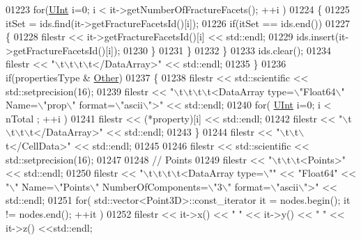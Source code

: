 \begin{DoxyCode}
01223             \textcolor{keywordflow}{for}(\hyperlink{namespaceFVCode3D_a4bf7e328c75d0fd504050d040ebe9eda}{UInt} i=0; i < it->getNumberOfFractureFacets(); ++i )
01224             \{
01225                 itSet = ids.find(it->getFractureFacetsId()[i]);
01226                 \textcolor{keywordflow}{if}(itSet == ids.end())
01227                 \{
01228                     filestr << it->getFractureFacetsId()[i] << std::endl;
01229                     ids.insert(it->getFractureFacetsId()[i]);
01230                 \}
01231             \}
01232         \}
01233         ids.clear();
01234         filestr << \textcolor{stringliteral}{"\(\backslash\)t\(\backslash\)t\(\backslash\)t\(\backslash\)t</DataArray>"} << std::endl;
01235     \}
01236     \textcolor{keywordflow}{if}(propertiesType & \hyperlink{namespaceFVCode3D_ab3abc77722284ce4344be90bb61c1a41ab8c2eb493dc98b25b8fc2e3e176d4892}{Other})
01237     \{
01238         filestr << std::scientific << std::setprecision(16);
01239         filestr << \textcolor{stringliteral}{"\(\backslash\)t\(\backslash\)t\(\backslash\)t\(\backslash\)t<DataArray type=\(\backslash\)"Float64\(\backslash\)" Name=\(\backslash\)"prop\(\backslash\)" format=\(\backslash\)"ascii\(\backslash\)">"} << std::endl;
01240         \textcolor{keywordflow}{for}( \hyperlink{namespaceFVCode3D_a4bf7e328c75d0fd504050d040ebe9eda}{UInt} i=0; i < nTotal ; ++i )
01241             filestr << (*property)[i] << std::endl;
01242         filestr << \textcolor{stringliteral}{"\(\backslash\)t\(\backslash\)t\(\backslash\)t\(\backslash\)t</DataArray>"} << std::endl;
01243     \}
01244     filestr << \textcolor{stringliteral}{"\(\backslash\)t\(\backslash\)t\(\backslash\)t</CellData>"} << std::endl;
01245 
01246     filestr << std::scientific << std::setprecision(16);
01247 
01248     \textcolor{comment}{// Points}
01249     filestr << \textcolor{stringliteral}{"\(\backslash\)t\(\backslash\)t\(\backslash\)t<Points>"} << std::endl;
01250     filestr << \textcolor{stringliteral}{"\(\backslash\)t\(\backslash\)t\(\backslash\)t\(\backslash\)t<DataArray type=\(\backslash\)""} << \textcolor{stringliteral}{"Float64"} << \textcolor{stringliteral}{"\(\backslash\)" Name=\(\backslash\)"Points\(\backslash\)" NumberOfComponents=\(\backslash\)"3\(\backslash\)"
       format=\(\backslash\)"ascii\(\backslash\)">"} << std::endl;
01251     \textcolor{keywordflow}{for}( std::vector<Point3D>::const\_iterator it = nodes.begin(); it != nodes.end(); ++it )
01252         filestr << it->x() << \textcolor{stringliteral}{" "} << it->y() << \textcolor{stringliteral}{" "} << it->z() <<std::endl;

\end{DoxyCode}

